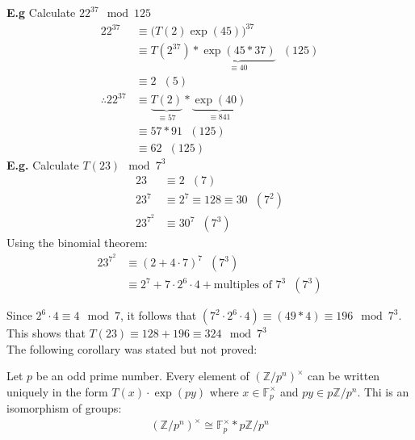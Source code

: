 \documentclass[11pt]{article}
\begin{document}
\textbf{E.g} Calculate $22^{37} \mod 125$
\begin{align*}
	22^{37} &\equiv \big(T(2)\exp(45) \big)^{37}\\
	&\equiv T(2^{37})* \underbrace{\exp(45*37)}_\text{$\equiv 40$} \hspace{7pt} (125)\\
	&\equiv 2 \hspace{7pt}(5)\\[1em]
	\therefore 22^{37} &\equiv \underbrace{T(2)}_\text{$\equiv 57$} * \underbrace{\exp(40)}_\text{$\equiv 841$}\\
	&\equiv 57*91 \hspace{7pt} (125)\\
	&\equiv 62 \hspace{7pt} (125) 
\end{align*}
\newpage
\textbf{E.g.} Calculate $T(23) \mod 7^3$
\begin{align*}
	23 &\equiv 2 \hspace{7pt} (7) \\
	23^7 &\equiv 2^7 \equiv 128 \equiv 30 \hspace{7pt} (7^2)\\
	23^{7^2} &\equiv 30^7 \hspace{7pt} (7^3)
\end{align*}
Using the binomial theorem: 
	\begin{align*}
		23^{7^2} &\equiv (2+ 4\cdot7 )^7\hspace{7pt} (7^3)\\
		&\equiv 2^7 + 7\cdot 2^6 \cdot 4 + \text{multiples of $7^3$} \hspace{7pt} (7^3)
	\end{align*}
	
	Since $2^6 \cdot 4 \equiv 4 \mod 7 $, it follows that $(7^2 \cdot 2^6 \cdot 4) \equiv (49* 4) \equiv 196 \mod 7^3 $. This shows that $T(23) \equiv 128 + 196 \equiv 324 \mod 7^3$\\[1em]


	The following corollary was stated but not proved:
\begin{corollary}
	Let $p$ be an odd prime number. Every element of $(\mathbb{Z}/p^n)^\times$ can be written uniquely in the form $T(x) \cdot \exp(py)$ where $x \in \mathbb{F}_p^{\times} $ and $py \in p\mathbb{Z}/p^n$. Thi is an isomorphism of groups:
	\begin{align*}
		(\mathbb{Z}/p^n)^\times \cong \mathbb{F}_p^\times * p\mathbb{Z}/p^n
	\end{align*}
\end{corollary}
\end{document}
